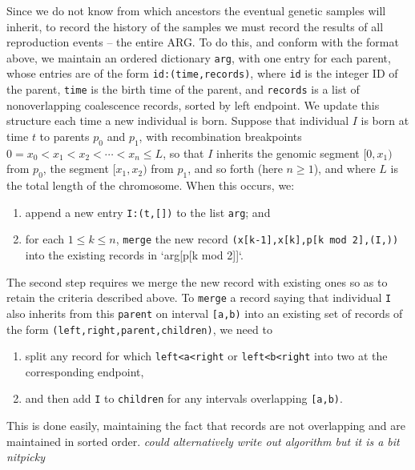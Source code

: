 \documentclass{bioinfo}
\newcommand{\plr}[1]{{\color{blue}\it #1}}
\begin{document}
\begin{methods}
Since we do not know from which ancestors
the eventual genetic samples will inherit,
to record the history of the samples
we must record the results of all reproduction events -- 
the entire ARG.
To do this, and conform with the format above, we maintain
an ordered dictionary \texttt{arg},
with one entry for each parent,
whose entries are of the form
\texttt{id:(time,records)},
where \texttt{id} is the integer ID of the parent,
\texttt{time} is the birth time of the parent,
and \texttt{records} is a list of nonoverlapping coalescence records, sorted by left endpoint.
We update this structure each time a new individual is born.
Suppose that individual $I$ is born at time $t$ to parents $p_0$ and $p_1$,
with recombination breakpoints $0=x_0 < x_1 < x_2 < \cdots < x_n \le L$,
so that $I$ inherits the genomic segment $[0,x_1)$ from $p_0$,
the segment $[x_1,x_2)$ from $p_1$, and so forth (here $n \ge 1$),
and where $L$ is the total length of the chromosome.
When this occurs, we:
\begin{enumerate}
    \item append a new entry \texttt{I:(t,[])} to the list \texttt{arg}; and
    \item for each $1 \le k \le n$, \texttt{merge} the new record \texttt{(x[k-1],x[k],p[k mod 2],(I,))}
        into the existing records in `arg[p[k mod 2]]`.
\end{enumerate}
The second step requires we merge the new record with existing ones
so as to retain the criteria described above.
To \texttt{merge} a record saying that individual \texttt{I} also inherits from this \texttt{parent} on interval \texttt{[a,b)}
into an existing set of records of the form \texttt{(left,right,parent,children)},
we need to 
\begin{enumerate}
    \item split any record for which \texttt{left<a<right} or \texttt{left<b<right} into two at the corresponding endpoint, 
    \item and then add \texttt{I} to \texttt{children} for any intervals overlapping \texttt{[a,b)}.
\end{enumerate}
This is done easily, maintaining the fact that records are not overlapping and are maintained in sorted order.
\plr{could alternatively write out algorithm but it is a bit nitpicky}


\end{methods}
\end{document}
